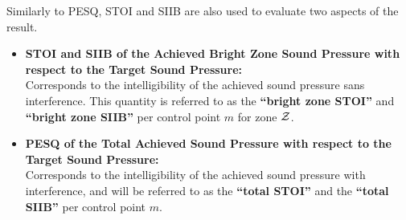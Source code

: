 Similarly to PESQ, STOI and SIIB are also used to evaluate two aspects of the result.
\begin{itemize}
    \item \textbf{STOI and SIIB of the Achieved Bright Zone Sound Pressure with respect to the Target Sound Pressure:}\\
        Corresponds to the intelligibility of the achieved sound pressure sans interference.
        This quantity is referred to as the \textbf{``bright zone STOI''} and \textbf{``bright zone SIIB''} per control point $m$ for zone $\mathcal{Z}$.
    \item \textbf{PESQ of the Total Achieved Sound Pressure with respect to the Target Sound Pressure:}\\
        Corresponds to the intelligibility of the achieved sound pressure with interference, and will be referred 
        to as the \textbf{``total STOI''} and the \textbf{``total SIIB''} per control point $m$. 
\end{itemize}

